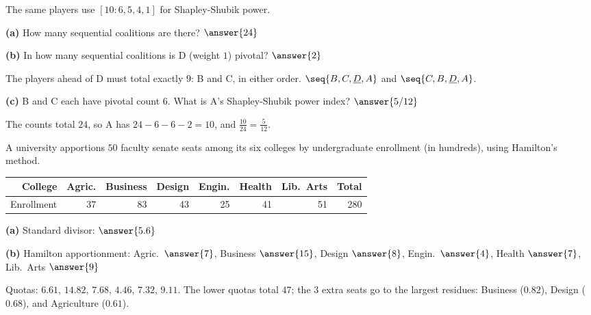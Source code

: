 \documentclass[12pt]{ximera}
\begin{document}
\begin{problem}
The same players use $[10:6,5,4,1]$ for Shapley-Shubik power.

\begin{prompt}
\textbf{(a)} How many sequential coalitions are there? $\answer{24}$
\end{prompt}

\begin{prompt}
\textbf{(b)} In how many sequential coalitions is D (weight $1$) pivotal? $\answer{2}$
\begin{feedback}
The players ahead of D must total exactly $9$: B and C, in either order.
$\seq{B,C,\underline D,A}$ and $\seq{C,B,\underline D,A}$.
\end{feedback}
\end{prompt}

\begin{prompt}
\textbf{(c)} B and C each have pivotal count $6$. What is A's Shapley-Shubik power index?
$\answer{5/12}$
\begin{feedback}
The counts total $24$, so A has $24-6-6-2=10$, and $\frac{10}{24}=\frac5{12}$.
\end{feedback}
\end{prompt}
\end{problem}

\begin{problem}
A university apportions $50$ faculty senate seats among its six colleges by
undergraduate enrollment (in hundreds), using Hamilton's method.
\begin{center}
\begin{tabular}{r|rrrrrr|r}
College & Agric. & Business & Design & Engin. & Health & Lib.\ Arts & Total\\\hline
Enrollment & 37 & 83 & 43 & 25 & 41 & 51 & 280
\end{tabular}
\end{center}

\begin{prompt}
\textbf{(a)} Standard divisor: $\answer{5.6}$
\end{prompt}

\begin{prompt}
\textbf{(b)} Hamilton apportionment: Agric.\ $\answer{7}$, Business $\answer{15}$,
Design $\answer{8}$, Engin.\ $\answer{4}$, Health $\answer{7}$, Lib.\ Arts $\answer{9}$
\begin{feedback}
Quotas: $6.61$, $14.82$, $7.68$, $4.46$, $7.32$, $9.11$. The lower quotas total $47$;
the $3$ extra seats go to the largest residues: Business ($0.82$), Design ($0.68$),
and Agriculture ($0.61$).
\end{feedback}
\end{prompt}
\end{problem}
\end{document}
